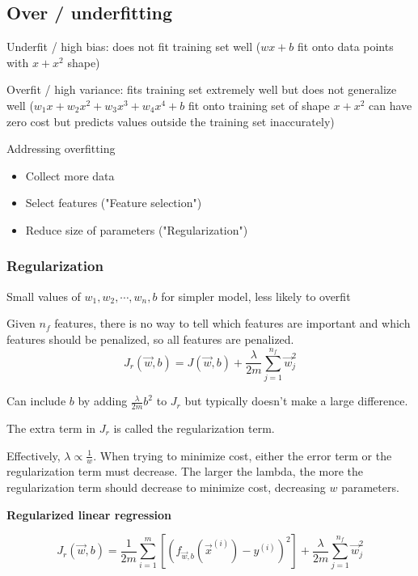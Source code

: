 \documentclass[12pt]{article}
\begin{document}
\subsection{Over / underfitting}

Underfit / high bias: does not fit training set well ($wx + b$ fit onto data points with $x + x^2$ shape)

Overfit / high variance: fits training set extremely well but does not generalize well ($w_1 x + w_2 x^2 + w_3 x^3 + w_4 x^4 + b$ fit onto training set of shape $x + x^2$ can have zero cost but predicts values outside the training set inaccurately)

\vspace{5px}

Addressing overfitting
\begin{itemize}
	\item Collect more data
	\item Select features ("Feature selection")
	\item Reduce size of parameters ("Regularization")
\end{itemize}

\subsubsection{Regularization}

Small values of $w_1,w_2,\cdots,w_n,b$ for simpler model, less likely to overfit

Given $n_f$ features, there is no way to tell which features are important and which features should be penalized, so all features are penalized.
\[ J_r(\vec{w},b) = J(\vec{w},b) + \frac{\lambda}{2m} \sum_{j=1}^{n_f} \vec{w}_j^2 \]

Can include $b$ by adding $\frac{\lambda}{2m} b^2$ to $J_r$ but typically doesn't make a large difference.

The extra term in $J_r$ is called the regularization term.

Effectively, $\lambda \propto \frac{1}{w}$. When trying to minimize cost, either the error term or the regularization term must decrease. The larger the lambda, the more the regularization term should decrease to minimize cost, decreasing $w$ parameters.

\noindent \textbf{Regularized linear regression}

\[ J_r(\vec{w},b) = \frac{1}{2m} \sum_{i=1}^m \left[(f_{\vec{w},b}(\vec{x}^{(i)}) - y^{(i)})^2\right] + \frac{\lambda}{2m} \sum_{j=1}^{n_f} \vec{w}_j^2 \]
\end{document}
